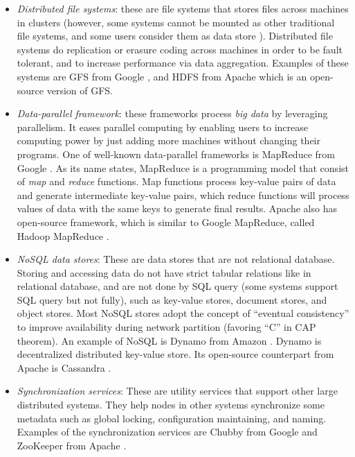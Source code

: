 \begin{itemize}

\item \textit{Distributed file systems}: these are file systems that stores
files across machines in clusters (however, some systems cannot be mounted as
other traditional file systems, and some users consider them as data store
\cite{HadoopStorage}). Distributed file systems do replication or erasure coding
across machines in order to be fault tolerant, and to increase performance via
data aggregation. Examples of these systems are GFS from Google
\cite{Ghemawat+03-GoogleFS}, and HDFS from Apache \cite{Shvachko+10-HDFSPaper}
which is an open-source version of GFS.

\item \textit{Data-parallel framework}: these frameworks process \textit{big
data} by leveraging parallelism. It eases parallel computing by enabling users
to increase computing power by just adding more machines without changing their
programs.  One of well-known data-parallel frameworks is MapReduce from Google
\cite{DeanGhemawat04-MapReduce}.  As its name states, MapReduce is a
programming model that consist of \textit{map} and \textit{reduce} functions.
Map functions process key-value pairs of data and generate intermediate
key-value pairs, which reduce functions will process values of data with the
same keys to generate final results. Apache also has open-source framework,
which is similar to Google MapReduce, called Hadoop MapReduce \cite{HadoopWeb}.

\item \textit{NoSQL data stores}: These are data stores that are not relational
database. Storing and accessing data do not have strict tabular relations like
in relational database, and are not done by SQL query (some systems support SQL
query but not fully), such as key-value stores, document stores, and object
stores. Most NoSQL stores adopt the concept of ``eventual consistency'' to
improve availability during network partition (favoring ``C'' in CAP theorem). An
example of NoSQL is Dynamo from Amazon \cite{DeCandia+07-Dynamo}. Dynamo is
decentralized distributed key-value store. Its open-source counterpart from
Apache is Cassandra \cite{Lakshman+09-Cassandra}.

\item \textit{Synchronization services}: These are utility services that support
other large distributed systems. They help nodes in other systems synchronize
some metadata such as global locking, configuration maintaining, and naming.
Examples of the synchronization services are Chubby from Google
\cite{Burrows06-Chubby} and ZooKeeper from Apache \cite{Hunt+10-ZooKeeperPaper}.

\end{itemize}
